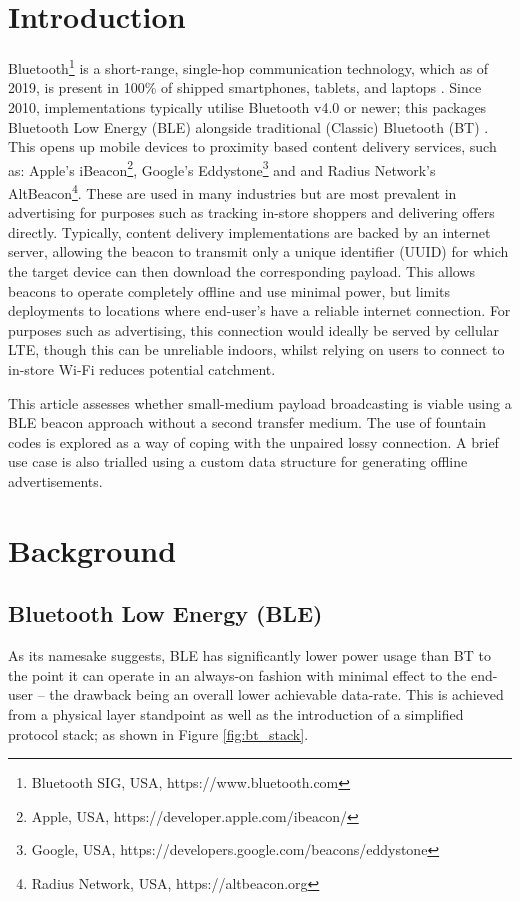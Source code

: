 \documentclass[conference]{IEEEtran} %
\begin{document}
\section{Introduction}
Bluetooth\footnote{Bluetooth SIG, USA, https://www.bluetooth.com} is a short-range, single-hop communication technology, which as of 2019, is present in 100\% of shipped smartphones, tablets, and laptops \cite{BT:MARKET_RESEARCH}. Since 2010, implementations typically utilise Bluetooth v4.0 or newer; this packages Bluetooth Low Energy (BLE) alongside traditional (Classic) Bluetooth (BT) \cite{BT:CORE_SPEC}. This opens up mobile devices to proximity based content delivery services, such as: Apple's iBeacon\footnote{Apple, USA, https://developer.apple.com/ibeacon/}, Google's Eddystone\footnote{Google, USA, https://developers.google.com/beacons/eddystone} and and Radius Network's AltBeacon\footnote{Radius Network, USA, https://altbeacon.org}. These are used in many industries but are most prevalent in advertising for purposes such as tracking in-store shoppers \cite{BT:TRACK_USE_CASE} and delivering offers directly. Typically, content delivery implementations are backed by an internet server, allowing the beacon to transmit only a unique identifier (UUID) for which the target device can then download the corresponding payload. This allows beacons to operate completely offline and use minimal power, but limits deployments to locations where end-user's have a reliable internet connection. For purposes such as advertising, this connection would ideally be served by cellular LTE, though this can be unreliable indoors, whilst relying on users to connect to in-store Wi-Fi reduces potential catchment.

This article assesses whether small-medium payload broadcasting is viable using a BLE beacon approach without a second transfer medium. The use of fountain codes is explored as a way of coping with the unpaired lossy connection. A brief use case is also trialled using a custom data structure for generating offline advertisements.

\section{Background}
\subsection{Bluetooth Low Energy (BLE)}
As its namesake suggests, BLE has significantly lower power usage than BT to the point it can operate in an always-on fashion with minimal effect to the end-user -- the drawback being an overall lower achievable data-rate. This is achieved from a physical layer standpoint as well as the introduction of a simplified protocol stack; as shown in Figure \ref{fig:bt_stack}. 
\end{document}
